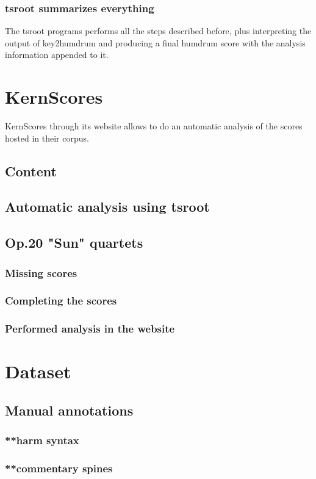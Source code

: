     \subsubsection{tsroot summarizes everything}
    The tsroot programs performs all the steps described before, plus interpreting the output of key2humdrum and producing a final humdrum score with the analysis information appended to it.
\section{KernScores}
  KernScores through its website allows to do an automatic analysis of the scores hosted in their corpus.
  \subsection{Content}
  \subsection{Automatic analysis using tsroot}
  \subsection{Op.20 "Sun" quartets}
    \subsubsection{Missing scores}
    \subsubsection{Completing the scores}
    \subsubsection{Performed analysis in the website}
\section{Dataset}
	\subsection{Manual annotations}
		\subsubsection{**harm syntax}
		\subsubsection{**commentary spines}

